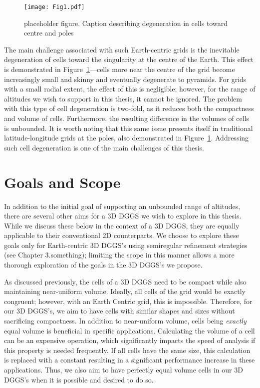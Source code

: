 \begin{figure}[h]
	\texttt{[image: Fig1.pdf]}
	\caption{placeholder figure.
		Caption describing degeneration in cells toward centre and poles}
	\label{fig:3dllg}
\end{figure}


The main challenge associated with such Earth-centric grids is the inevitable degeneration of cells toward the singularity at the centre of the Earth.
This effect is demonstrated in Figure~\ref{fig:3dllg}---cells more near the centre of the grid become increasingly small and skinny and eventually degenerate to pyramids.
For grids with a small radial extent, the effect of this is negligible; however, for the range of altitudes we wish to support in this thesis, it cannot be ignored.
The problem with this type of cell degeneration is two-fold, as it reduces both the compactness and volume of cells. 
Furthermore, the resulting difference in the volumes of cells is unbounded.
It is worth noting that this same issue presents itself in traditional latitude-longitude grids at the poles, also demonstrated in Figure~\ref{fig:3dllg}.
Addressing such cell degeneration is one of the main challenges of this thesis.


\section{Goals and Scope}
In addition to the initial goal of supporting an unbounded range of altitudes, there are several other aims for a 3D DGGS we wish to explore in this thesis.
While we discuss these below in the context of a 3D DGGS, they are equally applicable to their conventional 2D counterparts.
We choose to explore these goals only for Earth-centric 3D DGGS's using semiregular refinement strategies (see Chapter 3.something); limiting the scope in this manner allows a more thorough exploration of the goals in the 3D DGGS's we propose.


As discussed previously, the cells of a 3D DGGS need to be compact while also maintaining near-uniform volume.
Ideally, all cells of the grid would be exactly congruent; however, with an Earth Centric grid, this is impossible.
Therefore, for our 3D DGGS's, we aim to have cells with similar shapes and sizes without sacrificing compactness.
In addition to near-uniform volume, cells being \textit{exactly} equal volume is beneficial in specific applications.
Calculating the volume of a cell can be an expensive operation, which significantly impacts the speed of analysis if this property is needed frequently.
If all cells have the same size, this calculation is replaced with a constant resulting in a significant performance increase in these applications.
Thus, we also aim to have perfectly equal volume cells in our 3D DGGS's when it is possible and desired to do so.



